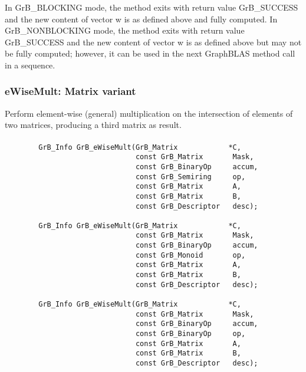 In {\sf GrB\_BLOCKING} mode, the method exits with return value 
{\sf GrB\_SUCCESS} and the new content of vector {\sf w} is as defined above
and fully computed.  
In {\sf GrB\_NONBLOCKING} mode, the method exits with return value 
{\sf GrB\_SUCCESS} and the new content of vector {\sf w} is as defined above 
but may not be fully computed; however, it can be used in the next GraphBLAS 
method call in a sequence.



\subsubsection{{\sf eWiseMult}: Matrix variant}

Perform element-wise (general) multiplication on the intersection of elements 
of two matrices, producing a third matrix as result.

\paragraph{\syntax}

\begin{verbatim}
        GrB_Info GrB_eWiseMult(GrB_Matrix            *C,
                               const GrB_Matrix       Mask,
                               const GrB_BinaryOp     accum,
                               const GrB_Semiring     op, 
                               const GrB_Matrix       A,
                               const GrB_Matrix       B,
                               const GrB_Descriptor   desc);
                            
        GrB_Info GrB_eWiseMult(GrB_Matrix            *C,
                               const GrB_Matrix       Mask,
                               const GrB_BinaryOp     accum,
                               const GrB_Monoid       op, 
                               const GrB_Matrix       A,
                               const GrB_Matrix       B,
                               const GrB_Descriptor   desc);
                            
        GrB_Info GrB_eWiseMult(GrB_Matrix            *C,
                               const GrB_Matrix       Mask,
                               const GrB_BinaryOp     accum,
                               const GrB_BinaryOp     op, 
                               const GrB_Matrix       A,
                               const GrB_Matrix       B,
                               const GrB_Descriptor   desc);
\end{verbatim}

